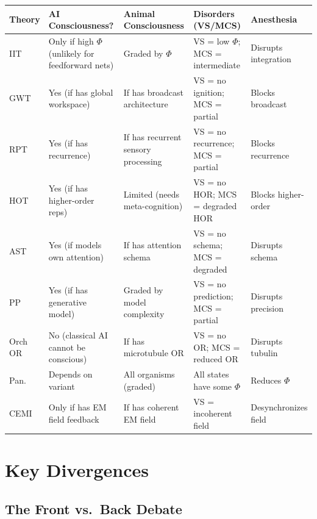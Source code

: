 \documentclass[11pt,a4paper]{report}
\begin{document}
\begin{center}
\renewcommand{\arraystretch}{1.35}
\small
\begin{tabular}{>{\raggedright}p{1.4cm} >{\raggedright}p{2.8cm} >{\raggedright}p{2.8cm} >{\raggedright}p{2.8cm} >{\raggedright\arraybackslash}p{2.8cm}}
  \toprule
  \textbf{Theory} & \textbf{AI Consciousness?} & \textbf{Animal Consciousness} & \textbf{Disorders (VS/MCS)} & \textbf{Anesthesia} \\
  \midrule
  IIT & Only if high $\Phi$ (unlikely for feedforward nets) & Graded by $\Phi$ & VS = low $\Phi$; MCS = intermediate & Disrupts integration \\
  GWT & Yes (if has global workspace) & If has broadcast architecture & VS = no ignition; MCS = partial & Blocks broadcast \\
  RPT & Yes (if has recurrence) & If has recurrent sensory processing & VS = no recurrence; MCS = partial & Blocks recurrence \\
  HOT & Yes (if has higher-order reps) & Limited (needs meta-cognition) & VS = no HOR; MCS = degraded HOR & Blocks higher-order \\
  AST & Yes (if models own attention) & If has attention schema & VS = no schema; MCS = degraded & Disrupts schema \\
  PP & Yes (if has generative model) & Graded by model complexity & VS = no prediction; MCS = partial & Disrupts precision \\
  Orch OR & No (classical AI cannot be conscious) & If has microtubule OR & VS = no OR; MCS = reduced OR & Disrupts tubulin \\
  Pan. & Depends on variant & All organisms (graded) & All states have some $\Phi$ & Reduces $\Phi$ \\
  CEMI & Only if has EM field feedback & If has coherent EM field & VS = incoherent field & Desynchronizes field \\
  \bottomrule
\end{tabular}
\end{center}


\chapter{Key Divergences}

\section{The Front vs.\ Back Debate}
\end{document}
